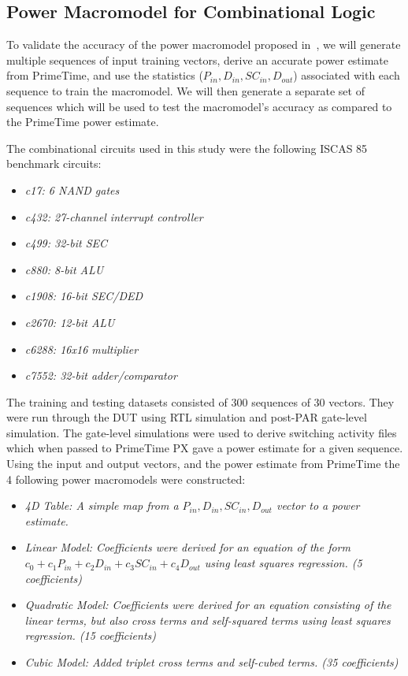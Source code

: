 \subsection{Power Macromodel for Combinational Logic}
To validate the accuracy of the power macromodel proposed in~\cite{Najm2000_2}, we will generate multiple sequences of input training vectors, derive an accurate power estimate from PrimeTime, and use the statistics ($P_{in}, D_{in}, SC_{in}, D_{out}$) associated with each sequence to train the macromodel. We will then generate a separate set of sequences which will be used to test the macromodel's accuracy as compared to the PrimeTime power estimate.

The combinational circuits used in this study were the following ISCAS 85 benchmark circuits:

\begin{itemize}
	\item \em{c17}: 6 NAND gates
	\item \em{c432}: 27-channel interrupt controller
	\item \em{c499}: 32-bit SEC
	\item \em{c880}: 8-bit ALU
	\item \em{c1908}: 16-bit SEC/DED
	\item \em{c2670}: 12-bit ALU
	\item \em{c6288}: 16x16 multiplier
	\item \em{c7552}: 32-bit adder/comparator 
\end{itemize}

The training and testing datasets consisted of 300 sequences of 30 vectors. They were run through the DUT using RTL simulation and post-PAR gate-level simulation. The gate-level simulations were used to derive switching activity files which when passed to PrimeTime PX gave a power estimate for a given sequence. Using the input and output vectors, and the power estimate from PrimeTime the 4 following power macromodels were constructed:

\begin{itemize}
	\item \em{4D Table}: A simple map from a $P_{in}, D_{in}, SC_{in}, D_{out}$ vector to a power estimate.
	\item \em{Linear Model}: Coefficients were derived for an equation of the form $c_0 + c_1 P_{in} + c_2 D_{in} + c_3 SC_{in} + c_4 D_{out}$ using least squares regression. (5 coefficients)
	\item \em{Quadratic Model}: Coefficients were derived for an equation consisting of the linear terms, but also cross terms and self-squared terms using least squares regression. (15 coefficients)
	\item \em{Cubic Model}: Added triplet cross terms and self-cubed terms. (35 coefficients)
\end{itemize}

